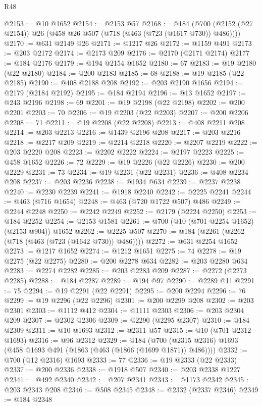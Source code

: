 \begin{lexlean}{R48}
\begin{coremodule}
@2153 := @10 @1652
@2154 := @2153 @57
@2168 := @184 (@700 (@2152 (@27 @2154)) @26 (@458 @26 @507 (@718 (@463 (@723 (@1617 @730)) @486))))
@2170 := @631 @2149 @26
@2171 := @1217 @26
@2172 := @1159 @491
@2173 := @203 @2172
@2174 := @2173 @209
@2176 := @2170 (@2171 @2174)
@2177 := @184 @2176
@2179 := @194 @2154 @1652
@2180 := 67
@2183 := @19 @2180 (@22 @2180)
@2184 := @200 @2183
@2185 := 68
@2188 := @19 @2185 (@22 @2185)
@2190 := @408 @2188 @208
@2192 := @203 @2190 @1656
@2194 := @2179 (@2184 @2192)
@2195 := @184 @2194
@2196 := @13 @1652
@2197 := @243 @2196
@2198 := 69
@2201 := @19 @2198 (@22 @2198)
@2202 := @200 @2201
@2203 := 70
@2206 := @19 @2203 (@22 @2203)
@2207 := @200 @2206
@2208 := 71
@2211 := @19 @2208 (@22 @2208)
@2213 := @408 @2211 @208
@2214 := @203 @2213
@2216 := @1439 @2196 @208
@2217 := @203 @2216
@2218 := @2217 @209
@2219 := @2214 @2218
@2220 := @2207 @2219
@2222 := @203 @2220 @208
@2223 := @2202 @2222
@2224 := @2197 @2223
@2225 := @458 @1652
@2226 := 72
@2229 := @19 @2226 (@22 @2226)
@2230 := @200 @2229
@2231 := 73
@2234 := @19 @2231 (@22 @2231)
@2236 := @408 @2234 @208
@2237 := @203 @2236
@2238 := @1934 @634
@2239 := @2237 @2238
@2240 := @2230 @2239
@2241 := @1918 @2240
@2242 := @2225 @2241
@2244 := @463 (@716 @1654)
@2248 := @463 (@720 @1722 @507) @486
@2249 := @2244 @2248
@2250 := @2242 @2249
@2252 := @2179 (@2224 @2250)
@2253 := @184 @2252
@2254 := @2153 @1581
@2261 := @700 (@10 (@701 @2254 @1652) (@2153 @904)) @1652
@2262 := @2225 @507
@2270 := @184 (@2261 (@2262 (@718 (@463 (@723 (@1642 @730)) @486))))
@2272 := @631 @2254 @1652
@2273 := @1217 @1652
@2274 := @1212 @1651
@2275 := 74
@2278 := @19 @2275 (@22 @2275)
@2280 := @200 @2278 @634
@2282 := @203 @2280 @634
@2283 := @2274 @2282
@2285 := @203 @2283 @209
@2287 := @2272 (@2273 @2285)
@2288 := @184 @2287
@2289 := @194 @97
@2290 := @2289 @11
@2291 := 75
@2294 := @19 @2291 (@22 @2291)
@2295 := @200 @2294
@2296 := 76
@2299 := @19 @2296 (@22 @2296)
@2301 := @200 @2299 @208
@2302 := @203 @2301
@2303 := @1112 @412
@2304 := @1111 @2303
@2306 := @203 @2304 @209
@2307 := @2302 @2306
@2309 := @2290 (@2295 @2307)
@2310 := @184 @2309
@2311 := @10 @1693
@2312 := @2311 @57
@2315 := @10 (@701 @2312 @1693)
@2316 := @96 @2312
@2329 := @184 (@700 (@2315 @2316) @1693 (@458 @1693 @491 (@1863 (@463 (@1866 (@1699 @1871)) @486))))
@2332 := @700 (@12 @2316) @1693
@2333 := 77
@2336 := @19 @2333 (@22 @2333)
@2337 := @200 @2336
@2338 := @1918 @507
@2340 := @203 @2338 @1227
@2341 := @492 @2340
@2342 := @207 @2341
@2343 := @1173 @2342
@2345 := @203 @2343 @208
@2346 := @508 @2345
@2348 := @2332 (@2337 @2346)
@2349 := @184 @2348

\end{coremodule}
\end{lexlean}
